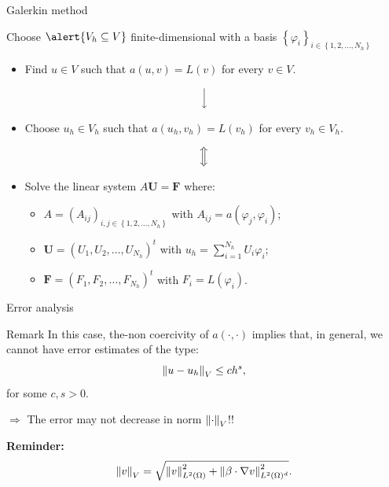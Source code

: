 \begin{frame}{Galerkin method}
	\begin{block}{}
	\begin{center}
	Choose $\alert{V_h\subseteq V}$ finite-dimensional with a basis $\left\{\varphi_i\right\}_{i\in\left\{1,2,\ldots,N_h \right\}}$
	\end{center}
	\end{block}
	
	\vspace*{-0.3cm}
	\begin{itemize}
	\item Find $u\in V$ such that $a(u,v)=L(v)$ for every $v\in V$.
	\end{itemize}
	\vspace*{0.1cm}
	$$\Big{\downarrow}$$
	\vspace*{-0.3cm}
	\begin{itemize}
	\item Choose $u_h\in V_h$ such that $a(u_h,v_h)=L(v_h)$ for every $v_h\in V_h$.
	\end{itemize}
	\vspace*{0.1cm}
	$$\Big{\Updownarrow}$$
	\vspace*{-0.3cm}
	\begin{itemize}
	\item Solve the linear system $A\mathbf{U}=\mathbf{F}$ where:
	\vspace*{0.3cm}
	\begin{itemize}
		\item $A=\left(A_{i j}\right)_{i, j\in\left\{1,2,\ldots,N_h\right\}}$ with $A_{i j}=a(\varphi_j,\varphi_i)$;
		\item $\mathbf{U}=\left(U_1,U_2,\ldots,U_{N_h}\right)^t$ with $u_h=\displaystyle\sum_{i=1}^{N_h}U_i\varphi_i$;
		\item $\mathbf{F}=\left(F_1,F_2,\ldots,F_{N_h}\right)^t$ with $F_i=L\left(\varphi_i\right)$.
	\end{itemize}
	\end{itemize}
\end{frame}

\begin{frame}{Error analysis}
	\begin{block}{Remark}
		In this case, the-non coercivity of $a(\cdot,\cdot)$ implies that, in general, we cannot have error estimates of the type:
		$$
		\left\|u-u_h\right\|_V\le c h^s,
		$$
		for some $c,s>0$.

		\vspace*{0.5cm}
		$\Longrightarrow$ \alert{The error may not decrease in norm $\left\|\cdot\right\|_{V}$!!}
		\vspace*{0.5cm}

		\textbf{Reminder:}
		$$
		\left\|v\right\|_V=\sqrt{\left\|v\right\|_{L^2(\Omega)}^2+\left\|\beta\cdot\nabla v\right\|_{L^2(\Omega)^d}^2}.
		$$
	\end{block}
\end{frame}

